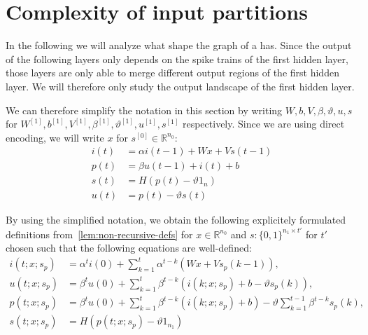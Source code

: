 \section{Complexity of input partitions}
\label{ch:partitions}

In the following we will analyze what shape the graph of a \rdtlifsnn has.
Since the output of the following layers only depends on the spike trains of the first hidden layer, those layers are only able to merge different output regions of the first hidden layer. We will therefore only study the output landscape of the first hidden layer.

We can therefore simplify the notation in this section by writing \(W,b,V,β,ϑ,u,s\) for \(W^{[1]},b^{[1]},V^{[1]},β^{[1]},ϑ^{[1]},u^{[1]},s^{[1]}\) respectively. Since we are using direct encoding, we will write \(x\) for \(s^{[0]}∈ℝ^{n_0}\):
  \begin{align}
    i(t) & = αi(t-1)+Wx+Vs(t-1) \\
    p(t) & = βu(t-1)+i(t)+b \\
    s(t) & = H(p(t)-ϑ1_n) \\
    u(t) & = p(t)-ϑs(t)
  \end{align}

By using the simplified notation, we obtain the following explicitely formulated definitions from~\autoref{lem:non-recursive-defs} for \(x∈ℝ^{n_0}\) and \(s:\{0,1\}^{n_1×t'}\) for \(t'\) chosen such that the following equations are well-defined:
\begin{align}
    i(t;x;s_p) &= α^ti(0)+\sum_{k=1}^tα^{t-k}\left(Wx+Vs_p(k-1)\right), \\\label{eq:1}
    u(t;x;s_p) &= β^tu(0)+\sum_{k=1}^tβ^{t-k}\left(i(k;x;s_p)+b-ϑs_p(k)\right), \\\label{eq:2}
    p(t;x;s_p) &= β^tu(0)+\sum_{k=1}^tβ^{t-k}\left(i(k;x;s_p)+b\right)-ϑ\sum_{k=1}^{t-1}β^{t-k}s_p(k), \\
    s(t;x;s_p) &= H(p(t;x;s_p)-ϑ1_{n_1})
\end{align}

